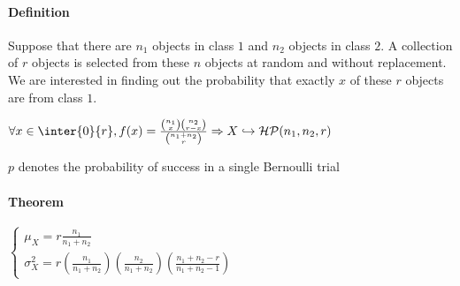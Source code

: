 \paragraph{Definition}
Suppose that there are $n_{1}$ objects in class $1$ and $n_{2}$ objects in
class $2$. A collection of $r$ objects is selected from these $n$ objects
at random and without replacement. We are interested in finding out the 
probability that exactly $x$ of these $r$ objects are from class $1$.
\begin{center}
	$\forall x\in \inter{0}{r}, f(x)= \frac{{n_{1}\choose x}{n_{2}\choose r-x}}{{n_{1}+n_{2}\choose r}}\Rightarrow X\hookrightarrow\mathcal{HP}(n_{1}, n_{2}, r)$
\end{center}
$p$ denotes the probability of success in a single Bernoulli trial
\paragraph{Theorem}
\begin{center}
$\begin{cases}
	\mu_{X}=r\frac{n_{1}}{n_{1}+n_{2}}\\
	\sigma_{X}^{2} = r\left(\frac{n_{1}}{n_{1}+n_{2}}\right)\left(\frac{n_{2}}{n_{1}+n_{2}}\right)\left(\frac{n_{1}+n_{2}-r}{n_{1}+n_{2}-1}\right)
\end{cases}$
\end{center}
